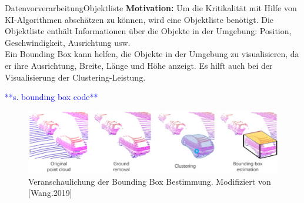 \documentclass[169, handout	]{THIbeamer} %
\begin{document}
	\begin{frame}{Datenvorverarbeitung}{Objektliste}
		\footnotesize
	\textbf{Motivation:} Um die Kritikalität mit Hilfe von KI-Algorithmen abschätzen zu können, wird eine Objektliste benötigt. Die Objektliste enthält Informationen über die Objekte in der Umgebung: Position, Geschwindigkeit, Ausrichtung usw.\\
	Ein Bounding Box kann helfen, die Objekte in der Umgebung zu visualisieren, da er ihre Ausrichtung, Breite, Länge und Höhe anzeigt. Es hilft auch bei der Visualisierung der Clustering-Leistung.
	
	\textcolor{blue}{**s. bounding box code**}
		\begin{figure}
			\includegraphics[scale=0.4]{required/Bounding_Box.jpg}
			\caption{Veranschaulichung der Bounding Box Bestimmung. Modifiziert von [Wang.2019]}
        	\label{Ground Subtraction}
       	\end{figure}
	\end{frame}
\end{document}
